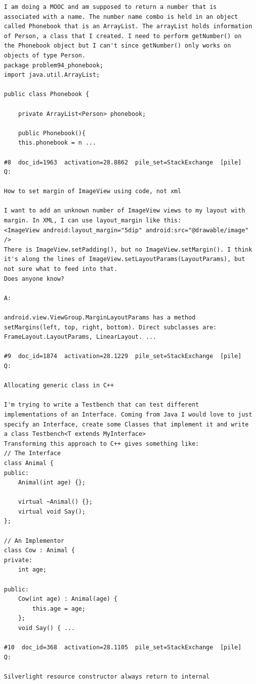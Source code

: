 \begin{verbatim}
I am doing a MOOC and am supposed to return a number that is associated with a name. The number name combo is held in an object called Phonebook that is an ArrayList. The arrayList holds information of Person, a class that I created. I need to perform getNumber() on the Phonebook object but I can't since getNumber() only works on objects of type Person.
package problem94_phonebook;
import java.util.ArrayList;

public class Phonebook {

    private ArrayList<Person> phonebook;

    public Phonebook(){
    this.phonebook = n ...

#8  doc_id=1963  activation=28.8862  pile_set=StackExchange  [pile]
Q:

How to set margin of ImageView using code, not xml

I want to add an unknown number of ImageView views to my layout with margin. In XML, I can use layout_margin like this:
<ImageView android:layout_margin="5dip" android:src="@drawable/image" />
There is ImageView.setPadding(), but no ImageView.setMargin(). I think it's along the lines of ImageView.setLayoutParams(LayoutParams), but not sure what to feed into that.
Does anyone know?

A:

android.view.ViewGroup.MarginLayoutParams has a method setMargins(left, top, right, bottom). Direct subclasses are: FrameLayout.LayoutParams, LinearLayout. ...

#9  doc_id=1874  activation=28.1229  pile_set=StackExchange  [pile]
Q:

Allocating generic class in C++

I'm trying to write a Testbench that can test different implementations of an Interface. Coming from Java I would love to just specify an Interface, create some Classes that implement it and write a class Testbench<T extends MyInterface>
Transforming this approach to C++ gives something like:
// The Interface
class Animal {
public:
    Animal(int age) {};

    virtual ~Animal() {};
    virtual void Say();
};

// An Implementor
class Cow : Animal {
private:
    int age;

public:
    Cow(int age) : Animal(age) {
        this.age = age;
    };
    void Say() { ...

#10  doc_id=368  activation=28.1105  pile_set=StackExchange  [pile]
Q:

Silverlight resource constructor always return to internal


\end{verbatim}
